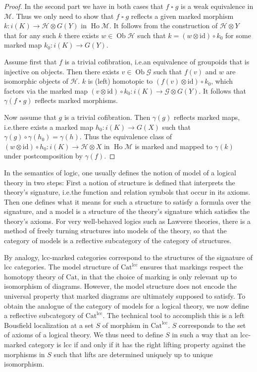 \documentclass[a4paper]{article}
\theoremstyle{remark}
\theoremstyle{definition}
\begin{document}
\begin{proof}
  In the second part we have in both cases that $f \mathbin{\square} g$ is a weak equivalence in $\mathcal{M}$.
  Thus we only need to show that $f \mathbin{\square} g$ reflects a given marked morphism $k : i(K) \rightarrow \mathcal{H} \otimes G(Y)$ in $\operatorname{Ho} \mathcal{M}$.
  It follows from the construction of $\mathcal{H} \otimes Y$ that for any such $k$ there exists $w \in \operatorname{Ob} \mathcal{H}$ such that $k = (w \otimes \mathrm{id}) \circ k_0$ for some marked map $k_0 : i(K) \rightarrow G(Y)$.

  Assume first that $f$ is a trivial cofibration, i.e.\@ an equivalence of groupoids that is injective on objects.
  Then there exists $v \in \operatorname{Ob} \mathcal{G}$ such that $f(v)$ and $w$ are isomorphic objects of $\mathcal{H}$.
  $k$ is (left) homotopic to $(f(v) \otimes \mathrm{id}) \circ k_0$, which factors via the marked map $(v \otimes \mathrm{id}) \circ k_0 : i(K) \rightarrow \mathcal{G} \otimes G(Y)$.
  It follows that $\gamma(f \mathbin{\square} g)$ reflects marked morphisms.

  Now assume that $g$ is a trivial cofibration.
  Then $\gamma(g)$ reflects marked maps, i.e.\@ there exists a marked map $h_0 : i(K) \rightarrow G(X)$ such that $\gamma(g) \circ \gamma(h_0) = \gamma(h)$.
  Thus the equivalence class of $(w \otimes \mathrm{id}) \circ h_0 : i(K) \rightarrow \mathcal{H} \otimes X$ in $\operatorname{Ho} \mathcal{M}$ is marked and mapped to $\gamma(k)$ under postcomposition by $\gamma(f)$.
\end{proof}

In the semantics of logic, one usually defines the notion of model of a logical theory in two steps:
First a notion of structure is defined that interprets the theory's signature, i.e.\@ the function and relation symbols that occur in its axioms.
Then one defines what it means for such a structure to satisfy a formula over the signature, and a model is a structure of the theory's signature which satisfies the theory's axioms.
For very well-behaved logics such as Lawvere theories, there is a method of freely turning structures into models of the theory, so that the category of models is a reflective subcategory of the category of structures.

By analogy, lcc-marked categories correspond to the structures of the signature of lcc categories.
The model structure of $\mathrm{Cat}^{\mathrm{lcc}}$ ensures that markings respect the homotopy theory of $\mathrm{Cat}$, in that the choice of marking is only relevant up to isomorphism of diagrams.
However, the model structure does not encode the universal property that marked diagrams are ultimately supposed to satisfy.
To obtain the analogue of the category of models for a logical theory, we now define a reflective subcategory of $\mathrm{Cat}^{\mathrm{lcc}}$.
The technical tool to accomplish this is a left Bousfield localization at a set $S$ of morphism in $\mathrm{Cat}^{\mathrm{lcc}}$.
$S$ corresponds to the set of axioms of a logical theory.
We thus need to define $S$ in such a way that an lcc-marked category is lcc if and only if it has the right lifting property against the morphisms in $S$ such that lifts are determined uniquely up to unique isomorphism.
\end{document}
